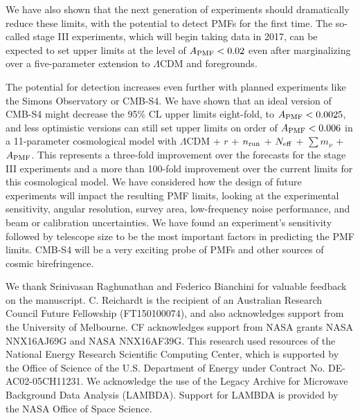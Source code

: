 \documentclass[apj]{emulateapj}
\newcommand{\apmf}{\ensuremath{A_{\rm PMF}}}
\newcommand{\lcdm}{\ensuremath{\Lambda}CDM}
\newcommand{\nrun}{\ensuremath{n_{\rm run}}}
\newcommand{\neff}{\ensuremath{N_{\rm eff}}}
\newcommand{\mnu}{\ensuremath{\sum m_\nu}}
\begin{document}
We have also shown that the next generation of experiments should dramatically reduce these limits, with the potential to detect PMFs for the first time. 
The so-called stage III experiments, which will begin taking data in 2017, can be expected to set upper limits at the level of $\apmf < 0.02$ even after marginalizing over a five-parameter extension to \lcdm{} and foregrounds. 

The potential for detection increases even further with planned experiments like the Simons Observatory or CMB-S4. 
We have shown that an ideal version of CMB-S4 might decrease the 95\% CL upper limits eight-fold, to $\apmf < 0.0025$, and less optimistic versions can still set upper limits on order of $\apmf < 0.006$ in a 11-parameter cosmological model with  \lcdm{} +  $r$ + \nrun{} +  \neff{} + \mnu{} + \apmf. 
This represents a three-fold improvement over the forecasts for the stage III experiments and a more than 100-fold improvement over the current limits for this cosmological model. 
We have considered how the design of future experiments will impact the resulting PMF limits, looking at the experimental sensitivity, angular resolution, survey area, low-frequency noise performance, and beam or calibration uncertainties. 
We have found an experiment's sensitivity followed by telescope size to be the most important factors in predicting the PMF limits. 
CMB-S4 will be a very exciting probe of PMFs and other sources of cosmic birefringence. 

\acknowledgments

We thank Srinivasan Raghunathan and Federico Bianchini for valuable feedback on the manuscript. 
C. Reichardt is the recipient of an Australian Research Council Future Fellowship (FT150100074), and also acknowledges support from the University of Melbourne. 
CF acknowledges support from NASA grants NASA NNX16AJ69G and NASA NNX16AF39G. 
This research used resources of the National Energy Research Scientific Computing Center, which is supported by the Office of Science of the U.S. Department of Energy under Contract No. DE-AC02-05CH11231. 
We acknowledge the use of the Legacy Archive for Microwave Background Data Analysis (LAMBDA). Support for LAMBDA is provided by the NASA Office of Space Science.



\end{document}
